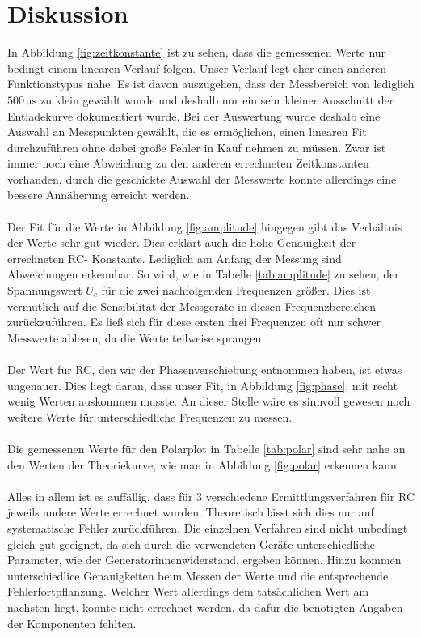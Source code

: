 \section{Diskussion}
\label{sec:Diskussion}
In Abbildung \ref{fig:zeitkonstante} ist zu sehen, dass die gemessenen Werte nur bedingt einem linearen Verlauf folgen.
Unser Verlauf legt eher einen anderen Funktionstypus nahe.
Es ist davon auszugehen, dass der Messbereich von lediglich $500 \, \mathrm{\mu s}$ zu klein gewählt wurde und deshalb nur ein sehr kleiner Ausschnitt der Entladekurve dokumentiert wurde.
Bei der Auswertung wurde deshalb eine Auswahl an Messpunkten gewählt, die es ermöglichen, einen linearen Fit durchzuführen ohne dabei große Fehler in Kauf nehmen zu müssen. Zwar ist immer noch eine Abweichung zu den anderen errechneten Zeitkonstanten vorhanden, durch die geschickte Auswahl der Messwerte konnte allerdings eine bessere Annäherung erreicht werden.
\\ \\
Der Fit für die Werte in Abbildung \ref{fig:amplitude} hingegen gibt das Verhältnis der Werte sehr gut wieder.
Dies erklärt auch die hohe Genauigkeit der errechneten RC- Konstante.
Lediglich am Anfang der Messung sind Abweichungen erkennbar.
So wird, wie in Tabelle \ref{tab:amplitude} zu sehen, der Spannungswert $U_c$ für die zwei nachfolgenden Frequenzen größer.
Dies ist vermutlich auf die Sensibilität der Messgeräte in diesen Frequenzbereichen zurückzuführen.
Es ließ sich für diese ersten drei Frequenzen oft nur schwer Messwerte ablesen, da die Werte teilweise sprangen.
\\ \\
Der Wert für RC, den wir der Phasenverschiebung entnommen haben, ist etwas ungenauer.
Dies liegt daran, dass unser Fit, in Abbildung \ref{fig:phase}, mit recht wenig Werten auskommen musste.
An dieser Stelle wäre es sinnvoll gewesen noch weitere Werte für unterschiedliche Frequenzen zu messen.
\\ \\
Die gemessenen Werte für den Polarplot in Tabelle \ref{tab:polar} sind sehr nahe an den Werten der Theoriekurve, wie man in Abbildung \ref{fig:polar} erkennen kann.
\\ \\
Alles in allem ist es auffällig, dass für 3 verschiedene Ermittlungsverfahren für RC jeweils andere Werte errechnet wurden.
Theoretisch lässt sich dies nur auf systematische Fehler zurückführen.
Die einzelnen Verfahren sind nicht unbedingt gleich gut geeignet, da sich durch die verwendeten Geräte unterschiedliche Parameter, wie der Generatorinnenwiderstand, ergeben können.
Hinzu kommen unterschiedlice Genauigkeiten beim Messen der Werte und die entsprechende Fehlerfortpflanzung.
Welcher Wert allerdings dem tatsächlichen Wert am nächsten liegt, konnte nicht errechnet werden, da dafür die benötigten Angaben der Komponenten fehlten.
